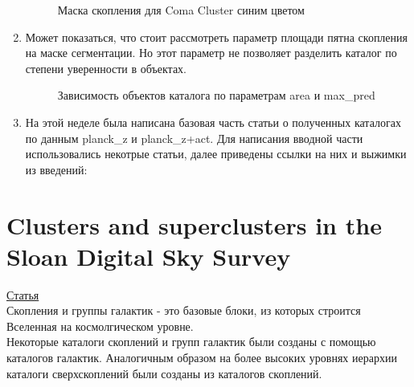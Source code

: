 \documentclass{article}
\begin{document}
\begin{enumerate}
\begin{figure}[h]
        \caption{Маска скопления для Coma Cluster синим цветом}
        \end{figure}
    \item Может показаться, что стоит рассмотреть параметр площади пятна скопления на маске 
        сегментации. Но этот параметр не позволяет разделить каталог по степени уверенности в 
        объектах.\\
        \begin{figure}[h]
        \caption{Зависимость объектов каталога по параметрам area и max\_pred}
        \end{figure}

    \item На этой неделе была написана базовая часть статьи о полученных каталогах по данным 
        planck\_z и planck\_z+act. Для написания вводной части использовались некотрые статьи, 
        далее приведены ссылки на них и выжимки из введений:\\
\end{enumerate}
\section{Clusters and superclusters in the Sloan Digital Sky Survey}
\hyperlink{https://www.aanda.org/articles/aa/pdf/2003/26/aah4162.pdf}{Статья}\\

Скопления и группы галактик - это базовые блоки, из которых строится Вселенная на космолгическом 
уровне.\\

Некоторые каталоги скоплений и групп галактик были созданы с помощью каталогов галактик. Аналогичным 
образом на более высоких уровнях иерархии каталоги сверхскоплений были созданы из каталогов скоплений.\\
\end{document}
